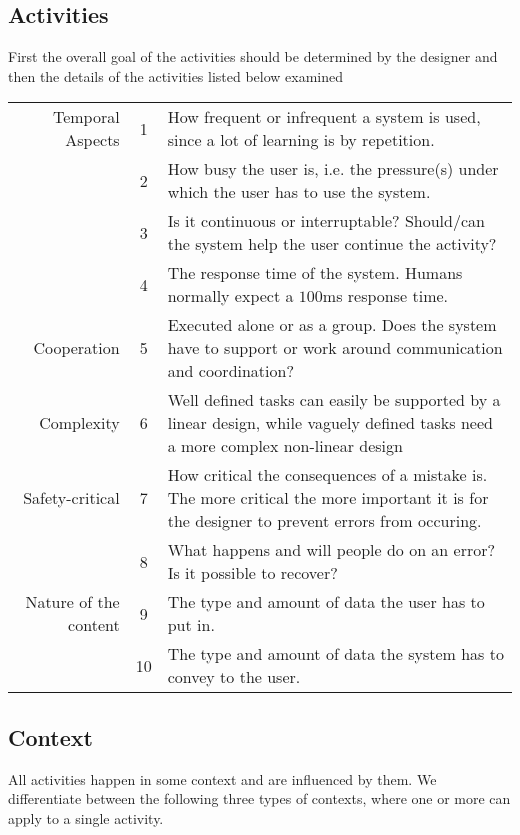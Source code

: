 \subsection{Activities}
First the overall goal of the activities should be determined by the designer and then the details of the activities listed below examined  \cite[p. 33-35]{benyon14}

\noindent
\begin{longtable}{rc>{\raggedright\arraybackslash}p{}}
  Temporal Aspects
  &  1 & How frequent or infrequent a system is used, since a lot of learning is by repetition.
  \\
  &  2 & How busy the user is, i.e. the pressure(s) under which the user has to use the system.
  \\
  &  3 & Is it continuous or interruptable? Should/can the system help the user continue the activity?
  \\
  &  4 & The response time of the system. Humans normally expect a $100$ms response time.
  \\
  Cooperation
  &  5 & Executed alone or as a group. Does the system have to support or work around communication and coordination?
  \\
  Complexity
  &  6 & Well defined tasks can easily be supported by a linear design, while vaguely defined tasks need a more complex non-linear design
  \\
  Safety-critical
  &  7 & How critical the consequences of a mistake is. The more critical the more important it is for the designer to prevent errors from occuring.
  \\
  &  8 & What happens and will people do on an error? Is it possible to recover?
  \\
  Nature of the content
  &  9 & The type and amount of data the user has to put in.
  \\
  & 10 & The type and amount of data the system has to convey to the user.
\end{longtable}

\subsection{Context}
All activities happen in some context and are influenced by them. We differentiate between the following three types of contexts, where one or more can apply to a single activity. \cite[p. 34-35]{benyon14}

